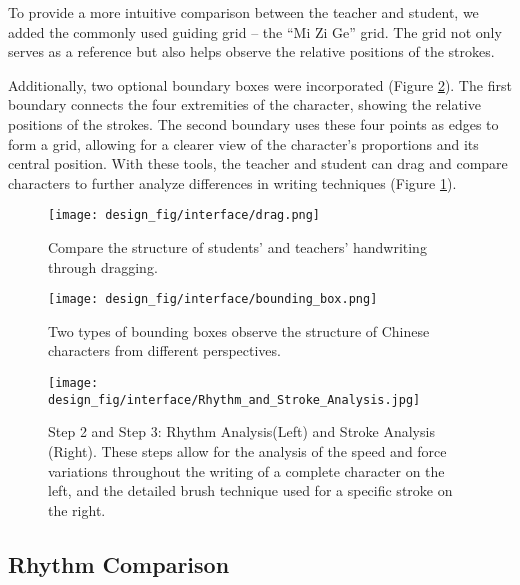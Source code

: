 To provide a more intuitive comparison between the teacher and student, we added the commonly used guiding grid – the ``Mi Zi Ge'' grid\cite{chinese_calligraphy_grids}. The grid not only serves as a reference but also helps observe the relative positions of the strokes.

Additionally, two optional boundary boxes were incorporated (Figure \ref{fig:bounding box}). The first boundary connects the four extremities of the character, showing the relative positions of the strokes. The second boundary uses these four points as edges to form a grid, allowing for a clearer view of the character's proportions and its central position. With these tools, the teacher and student can drag and compare characters to further analyze differences in writing techniques (Figure \ref{fig:drag}).

\begin{figure}[H]
    \centering
    \texttt{[image: design\_fig/interface/drag.png]}
    \caption{Compare the structure of students' and teachers' handwriting through dragging.}
    \label{fig:drag}
\end{figure}


\begin{figure}[H]
    \centering

    \texttt{[image: design\_fig/interface/bounding\_box.png]}
    \caption{Two types of bounding boxes observe the structure of Chinese characters from different perspectives.}
    \label{fig:bounding box}
\end{figure}



\begin{figure}[htbp]
    \centering
    \texttt{[image: design\_fig/interface/Rhythm\_and\_Stroke\_Analysis.jpg]}
    \caption{Step 2 and Step 3: Rhythm Analysis(Left) and Stroke Analysis (Right). These steps allow for the analysis of the speed and force variations throughout the writing of a complete character on the left, and the detailed brush technique used for a specific stroke on the right.}
    \label{fig:Rhythm and Stroke Analysis}
\end{figure}

\subsection{Rhythm Comparison}

